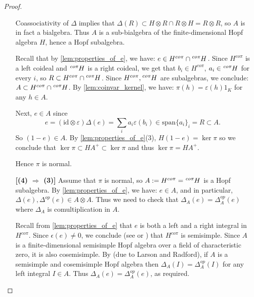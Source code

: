 \documentclass{amsart}
\theoremstyle{plain}%
\theoremstyle{remark}
\newcommand{\1}{\mathbbm{1}}
\newcommand{\Z}{\mathbb{Z}}
\newcommand{\id}{\mathrm{id}}
\newcommand{\eps}{\epsilon}
\newcommand{\comment}[1]{}
\newcommand{\prescr}[2]{\tensor*[^{#1}]{#2}{}}
\begin{document}
\begin{proof}
\begin{enumerate}
Coassociativity of $\Delta$ implies that $\Delta(R)\subset H\otimes R\cap R\otimes H= R\otimes R$, so $A$ is in fact a bialgebra. Thus $A$ is a sub-bialgebra of the finite-dimensional Hopf algebra $H$, hence a Hopf subalgebra.

Recall that by \cref{lem:properties_of_e}, we have: $e\in H^{co \pi}\cap \prescr{co \pi}{H}$. Since $H^{co \pi}$ is a left coideal and $\prescr{co \pi}{H}$ is a right coideal, we get that $b_i\in H^{co \pi}$, $a_i\in \prescr{co \pi}{H}$ for every $i$, so $R\subset H^{co \pi}\cap \prescr{co \pi}{H}$. Since $H^{co \pi}, \prescr{co \pi}{H}$ are subalgebras, we conclude: $A\subset H^{co \pi}\cap \prescr{co \pi}{H}$. By \cref{lem:coinvar_kernel}, we have: $\pi(h) = \varepsilon(h)1_K$ for any $h\in A$.


Next, $e\in A$ since
$$e=(\id\otimes \varepsilon)\Delta(e)=\sum_i a_i\varepsilon(b_i) \in \mathrm{span}\{a_i\}_i =R\subset A.$$
So $(1-e)\in A$. By \cref{lem:properties_of_e}(3), $H(1-e) = \ker \pi$ so we conclude that $\ker \pi \subset HA^+ \subset \ker \pi$ and thus  $\ker \pi = HA^+$.
\comment{
By the Nichols-Zoeller Theorem (\cite{NZ}), $H$ is free over $A$. Let $m:=  rk_A H=\frac{\dim(H)}{\dim(A)} \in \Z$; we will show that $m=\dim K$.

Indeed, consider the short exact sequence of left $A$-modules
        $$
            0\to A^+\to A\xrightarrow{\varepsilon} \1_A\to 0.
        $$ where $\1_A $ stands for the trivial $1$-dimensional $A$-module.
        Applying $H\otimes_A-$ gives a short exact sequence of $H$-modules
        $$
            0\to H A^+\to H\to H\otimes_A \1_A\to 0
        $$
        and $\dim H\otimes_A \1_A = rk_A H=m$.
     We conclude that $$ m = \frac{\dim(H)}{\dim(A)}=\dim H-\dim HA^+ = \dim H-\dim \ker \pi = \dim K$$ as required. 
     }
     Hence $\pi$ is normal.
     \item[\textbf{[(4) $\Longrightarrow$ (3)]}]  Assume that $\pi$ is normal, so $ A:=H^{co \pi}=\prescr{co \pi}{H}$ is a Hopf subalgebra. By \cref{lem:properties_of_e}, we have: $e\in A$, and in particular, $\Delta(e), \Delta^{op}(e) \in A\otimes A$. Thus we need to check that $\Delta_A(e)= \Delta^{op}_A(e)$ where $\Delta_A$ is comultiplication in $A$.

    Recall from \cref{lem:properties_of_e} that $e$ is both a left and a right integral in $H^{co \pi}$. Since $\eps(e)\ne 0$, we conclude (see \cite{LS} or \cite[Proposition 6.5.6.]{EGNO}) that $H^{co \pi}$ is semisimple.  
    Since $A$ is a finite-dimensional semisimple Hopf algebra over a field of characteristic zero, it is also cosemisimple.
By \cite[Proposition 7.18.14]{EGNO} (due to Larson and Radford), if $A$ is a semisimple and cosemisimple Hopf algebra then $\Delta_A(I)= \Delta^{op}_A(I)$ for any left integral $I\in A$. Thus $\Delta_A(e)= \Delta^{op}_A(e)$, as required. 



\end{enumerate}
\end{proof}
\end{document}
